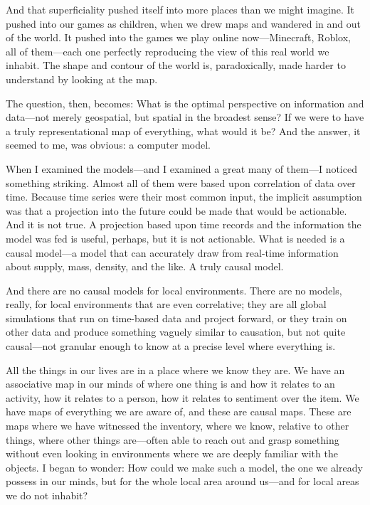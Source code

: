 And that superficiality pushed itself into more places than we might imagine. It pushed into our games as children, when we drew maps and wandered in and out of the world. It pushed into the games we play online now—Minecraft, Roblox, all of them—each one perfectly reproducing the view of this real world we inhabit. The shape and contour of the world is, paradoxically, made harder to understand by looking at the map.

The question, then, becomes: What is the optimal perspective on information and data—not merely geospatial, but spatial in the broadest sense? If we were to have a truly representational map of everything, what would it be? And the answer, it seemed to me, was obvious: a computer model.

When I examined the models—and I examined a great many of them—I noticed something striking. Almost all of them were based upon correlation of data over time. Because time series were their most common input, the implicit assumption was that a projection into the future could be made that would be actionable. And it is not true. A projection based upon time records and the information the model was fed is useful, perhaps, but it is not actionable. What is needed is a causal model—a model that can accurately draw from real-time information about supply, mass, density, and the like. A truly causal model.

And there are no causal models for local environments. There are no models, really, for local environments that are even correlative; they are all global simulations that run on time-based data and project forward, or they train on other data and produce something vaguely similar to causation, but not quite causal—not granular enough to know at a precise level where everything is.

All the things in our lives are in a place where we know they are. We have an associative map in our minds of where one thing is and how it relates to an activity, how it relates to a person, how it relates to sentiment over the item. We have maps of everything we are aware of, and these are causal maps. These are maps where we have witnessed the inventory, where we know, relative to other things, where other things are—often able to reach out and grasp something without even looking in environments where we are deeply familiar with the objects. I began to wonder: How could we make such a model, the one we already possess in our minds, but for the whole local area around us—and for local areas we do not inhabit?

